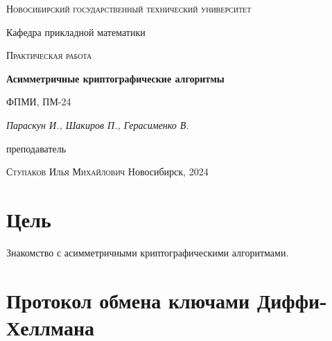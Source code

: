 \documentclass[12pt, a4paper]{article}
\begin{document}
\begin{titlepage}
  \centering
  \textsc{Новосибирский государственный технический университет}\par
  \vspace{1mm}
  Кафедра прикладной математики\par
  \vspace{4cm}
  \textsc{Практическая работа }\par
  {\huge\bfseries Асимметричные криптографические алгоритмы\par}
  \vspace{1cm}
  {\scriptsize ФПМИ, ПМ-24\par}
  \vspace{1mm}
  {\itshape\large Параскун И., Шакиров П., Герасименко В.\par}
  \vfill
  {\small преподаватель\par}
  \vspace{1mm}
  \textsc{Ступаков Илья Михайлович}
  \vfill
  \large{Новосибирск, 2024}
\end{titlepage}

\newpage

\section{Цель}
Знакомство с асимметричными криптографическими алгоритмами.

\section{Протокол обмена ключами Диффи-Хеллмана}
\end{document}
